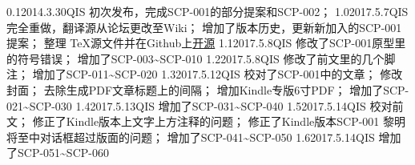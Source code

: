 


\begin{versionhistory}
\vhEntry
{0.1}{2014.3.30}{QIS}{
	初次发布，完成SCP-001的部分提案和SCP-002；
}
\vhEntry
{1.0}{2017.5.7}{QIS}{
	完全重做，翻译源从论坛更改至Wiki；
	增加了版本历史，更新新加入的SCP-001提案；
	整理 \TeX 源文件并在Github上\href{https://github.com/7sDream/scp-pdf}{开源}
}
\vhEntry
{1.1}{2017.5.8}{QIS}{
	修改了SCP-001原型里的符号错误；
	增加了SCP-003\textasciitilde SCP-010
}
\vhEntry
{1.2}{2017.5.8}{QIS}{
	修改了前文里的几个脚注；
	增加了SCP-011\textasciitilde SCP-020
}
\vhEntry
{1.3}{2017.5.12}{QIS}{
	校对了SCP-001中的文章；
	修改封面；
	去除生成PDF文章标题上的间隔；
	增加Kindle专版6寸PDF；
	增加了SCP-021\textasciitilde SCP-030
}
\vhEntry
{1.4}{2017.5.13}{QIS}{
    增加了SCP-031\textasciitilde SCP-040
}
\vhEntry
{1.5}{2017.5.14}{QIS}{
    校对前文；
    修正了Kindle版本上文字上方注释的问题；
    修正了Kindle版本SCP-001 黎明将至中对话框超过版面的问题；
    增加了SCP-041\textasciitilde SCP-050
}
\vhEntry
{1.6}{2017.5.14}{QIS}{
    增加了SCP-051\textasciitilde SCP-060
}
\end{versionhistory}
